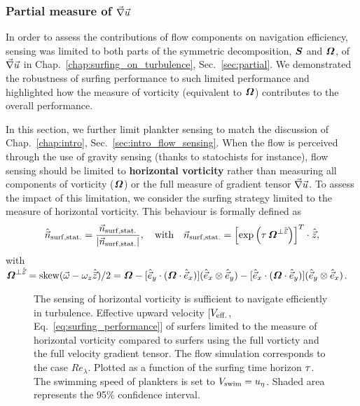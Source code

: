 \subsubsection{Partial measure of $\vec{\nabla} \vec{u}$}\label{sec:rob_partial_measure}

In order to assess the contributions of flow components on navigation efficiency, sensing was limited to both parts of the symmetric decomposition, $\boldsymbol{S}$ and $\boldsymbol{\varOmega}$, of $\vec{\nabla} \vec{u}$ in Chap.~\ref{chap:surfing_on_turbulence}, Sec.~\ref{sec:partial}.
We demonstrated the robustness of surfing performance to such limited performance and highlighted how the measure of vorticity (equivalent to $\boldsymbol{\varOmega}$) contributes to the overall performance.

In this section, we further limit plankter sensing to match the discussion of Chap.~\ref{chap:intro}, Sec.~\ref{sec:intro_flow_sensing}.
When the flow is perceived through the use of gravity sensing (thanks to statochists for instance), flow sensing should be limited to \textbf{horizontal vorticity} rather than measuring all components of vorticity ($\boldsymbol{\varOmega}$) or the full measure of gradient tensor $\vec{\nabla} \vec{u}$.
To assess the impact of this limitation, we consider the surfing strategy limited to the measure of horizontal vorticity.
This behaviour is formally defined as
\begin{equation}
	\hat{\vec{n}}_{\mathrm{surf}, \mathrm{stat.}} = \frac{\vec{n}_{\mathrm{surf}, \mathrm{stat.}}}{\lvert\vec{n}_{\mathrm{surf}, \mathrm{stat.}}\rvert}, \quad \text{with} \quad \vec{n}_{\mathrm{surf}, \mathrm{stat.}} = \left[ \exp \left( \tau \, \boldsymbol{\varOmega}^{\bot \hat{\vec{z}}} \right) \right]^T \cdot \hat{\vec{z}},
\end{equation}
with $\boldsymbol{\varOmega}^{\bot \hat{\vec{z}}} = \operatorname{skew} (\vec{\omega} - \omega_z \hat{\vec{z}}) / 2 = \boldsymbol{\varOmega} - [\hat{\vec{e}}_y \cdot (\boldsymbol{\varOmega} \cdot \hat{\vec{e}}_x)] (\hat{\vec{e}}_x \otimes \hat{\vec{e}}_y) - [\hat{\vec{e}}_x \cdot (\boldsymbol{\varOmega} \cdot \hat{\vec{e}}_y)] (\hat{\vec{e}}_y \otimes \hat{\vec{e}}_x)$.
\begin{figure}%
	\centering
	
	\caption[The sensing of horizontal vorticity is sufficient to navigate efficiently in turbulence.]{
		The sensing of horizontal vorticity is sufficient to navigate efficiently in turbulence.
		Effective upward velocity [$V_{\mathrm{eff.}}$, Eq.~\eqref{eq:surfing_performance}] of surfers limited to the measure of horizontal vorticity compared to surfers using the full vorticty and the full velocity gradient tensor.
		The flow simulation corresponds to the case $\mathit{Re}_{\lambda}$.
		Plotted as a function of the surfing time horizon $\tau$.
		The swimming speed of plankters is set to $V_{\mathrm{swim}} = u_{\eta}$.
		Shaded area represents the 95\% confidence interval.
	}
	\label{fig:statochist}
\end{figure}

